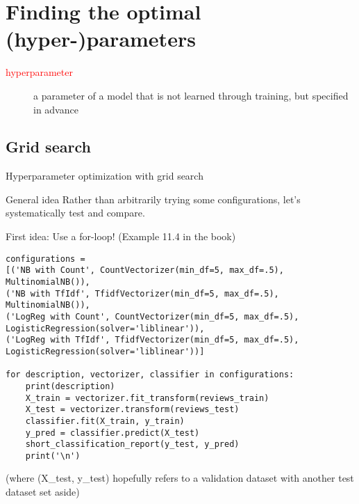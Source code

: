 \section[Hyperparameters]{Finding the optimal (hyper-)parameters}

\begin{frame}[plain]
\centering
\begin{description}
\item[\textcolor{red}{hyperparameter}] a parameter of a model that is not learned through training, but specified in advance
\end{description}
	
\end{frame}



\subsection{Grid search}

\begin{frame}{Hyperparameter optimization with grid search}
\begin{block}{General idea}
	Rather than arbitrarily trying some configurations, let's systematically test and compare.
\end{block}
First idea: Use a for-loop! (Example 11.4 in the book)
\end{frame}

\begin{frame}
	\small
\begin{verbatim}
configurations = 
[('NB with Count', CountVectorizer(min_df=5, max_df=.5), MultinomialNB()),
('NB with TfIdf', TfidfVectorizer(min_df=5, max_df=.5), MultinomialNB()),
('LogReg with Count', CountVectorizer(min_df=5, max_df=.5), LogisticRegression(solver='liblinear')),
('LogReg with TfIdf', TfidfVectorizer(min_df=5, max_df=.5), LogisticRegression(solver='liblinear'))]

for description, vectorizer, classifier in configurations:
    print(description)
    X_train = vectorizer.fit_transform(reviews_train)
    X_test = vectorizer.transform(reviews_test)
    classifier.fit(X_train, y_train)
    y_pred = classifier.predict(X_test)
    short_classification_report(y_test, y_pred)
    print('\n')
\end{verbatim}
(where (X\_test, y\_test) hopefully refers to a validation dataset with another test dataset set aside) 
\end{frame}


